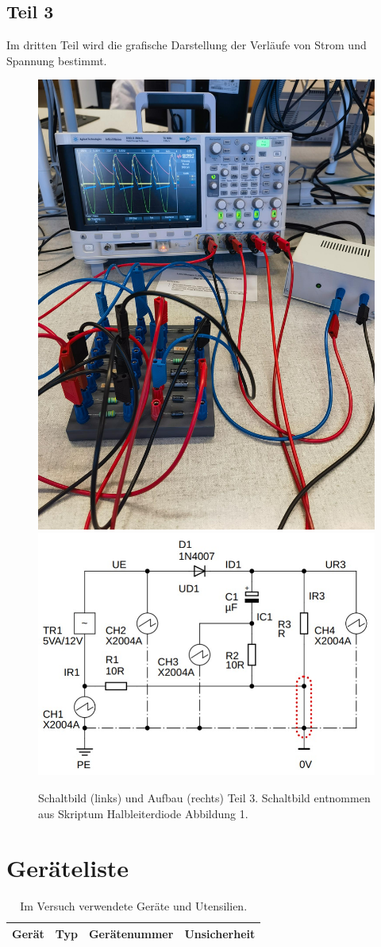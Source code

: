 \documentclass[12pt,a4paper,twoside]{article}
\begin{document}
\subsection{Teil 3}
Im dritten Teil wird die grafische Darstellung der Verläufe von Strom und Spannung bestimmt. 

\begin{figure}[H]
    \centering
    \includegraphics[width=0.4\linewidth]{nudes/3.jpg}
    \includegraphics[width=0.4\linewidth]{nudes/aufbau3 schaltplan.jpg}
    \caption{Schaltbild (links) und Aufbau (rechts) Teil 3. Schaltbild entnommen aus Skriptum Halbleiterdiode Abbildung 1. \cite{teachcenter2}}
    \label{fig:aufbau 3}
\end{figure}

\section{Geräteliste} %

    \begin{table}[H]
        \centering
        \caption{Im Versuch verwendete Geräte und Utensilien.}
        \label{tab:geraete}
        \begin{tabular}{| l | l | l | l |}
            \hline
            Gerät   & Typ   & Gerätenummer  & Unsicherheit \\
            \hline
        \end{tabular}
    \end{table}
\end{document}
